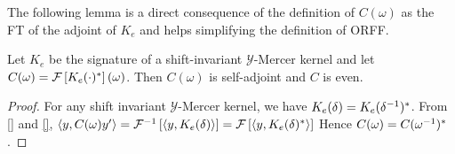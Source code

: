The following lemma is a direct consequence of the definition of $C(\omega)$ as the \acl{FT} of the adjoint of $K_e$ and helps simplifying the definition of \acs{ORFF}.
\begin{lemma}
\label{lm:C_characterization}
Let $K_e$ be the signature of a shift-invariant $\mathcal{Y}$-Mercer kernel and let $C(\omega)=\mathcal{F}\left[K_e(\cdot)^*\right](\omega)$. Then $C(\omega)$ is self-adjoint and $C$ is even.
\end{lemma}
\begin{proof}
For any shift invariant $\mathcal{Y}$-Mercer kernel, we have $K_e(\delta)=K_e({\delta}^{-1})^*$. From \cref{} and \cref{}, $\langle y,C(\omega)y'\rangle=\mathcal{F}^{-1}\left[\langle y,K_e(\delta)\rangle\right]=\mathcal{F}\left[\langle y,K_e(\delta)^*\rangle\right]$
Hence $C(\omega)=C({\omega}^{-1})^*$.



\end{proof}


